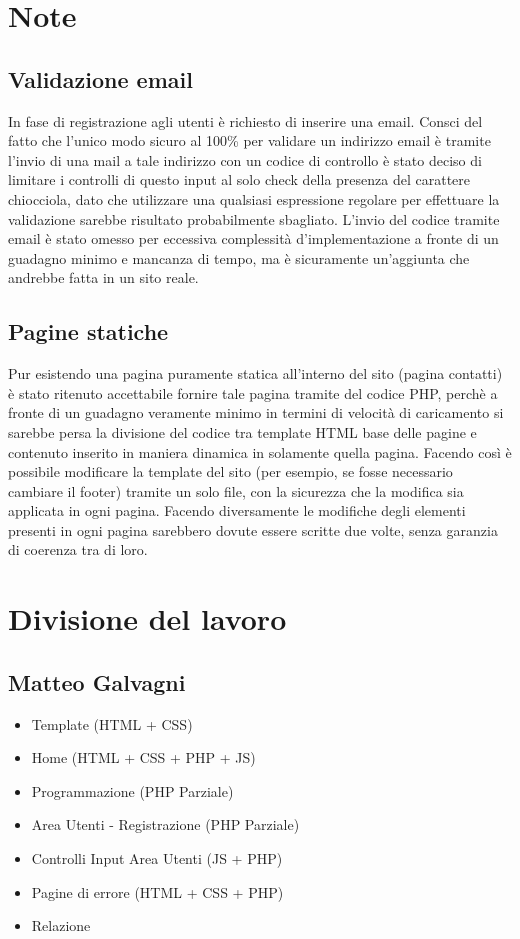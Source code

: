 \documentclass[a4paper, 12pt]{article}
\begin{document}
\section{Note}
\subsection{Validazione email}
In fase di registrazione agli utenti è richiesto di inserire una email. Consci del fatto che l'unico modo sicuro al 100\% per validare un indirizzo email è tramite l'invio di una mail a tale indirizzo con un codice di controllo è stato deciso di limitare i controlli di questo input al solo check della presenza del carattere chiocciola, dato che utilizzare una qualsiasi espressione regolare per effettuare la validazione sarebbe risultato probabilmente sbagliato. L'invio del codice tramite email è stato omesso per eccessiva complessità d'implementazione a fronte di un guadagno minimo e mancanza di tempo, ma è sicuramente un'aggiunta che andrebbe fatta in un sito reale.
\subsection{Pagine statiche}
Pur esistendo una pagina puramente statica all'interno del sito (pagina contatti) è stato ritenuto accettabile fornire tale pagina tramite del codice PHP, perchè a fronte di un guadagno veramente minimo in termini di velocità di caricamento si sarebbe persa la divisione del codice tra template HTML base delle pagine e contenuto inserito in maniera dinamica in solamente quella pagina.
Facendo così è possibile modificare la template del sito (per esempio, se fosse necessario cambiare il footer) tramite un solo file, con la sicurezza che la modifica sia applicata in ogni pagina. Facendo diversamente le modifiche degli elementi presenti in ogni pagina sarebbero dovute essere scritte due volte, senza garanzia di coerenza tra di loro.

\newpage
\section{Divisione del lavoro}
\subsection{Matteo Galvagni}
\begin{itemize}
    \item Template (HTML + CSS)
    \item Home (HTML + CSS + PHP + JS)
    \item Programmazione (PHP Parziale)
    \item Area Utenti - Registrazione (PHP Parziale)
    \item Controlli Input Area Utenti (JS + PHP)
    \item Pagine di errore (HTML + CSS + PHP)
    \item Relazione
\end{itemize}
\end{document}
